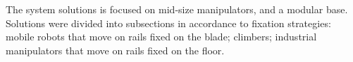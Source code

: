 
The system solutions is focused on mid-size manipulators, and a modular base.
Solutions were divided into subsections in accordance to fixation strategies:
mobile robots that move on rails fixed on the blade; climbers; industrial
manipulators that move on rails fixed on the floor.






 
%